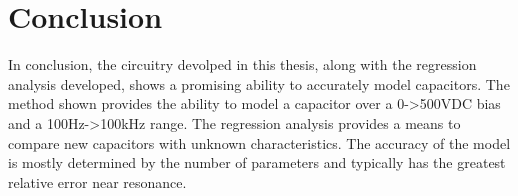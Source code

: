\section {Conclusion}

In conclusion, the circuitry devolped in this thesis, along with the regression analysis developed, shows a promising ability to accurately model capacitors. The method shown provides the ability to model a capacitor over a 0->500VDC bias and a 100Hz->100kHz range. The regression analysis provides a means to compare new capacitors with unknown characteristics. The accuracy of the model is mostly determined by the number of parameters and typically has the greatest relative error near resonance.

